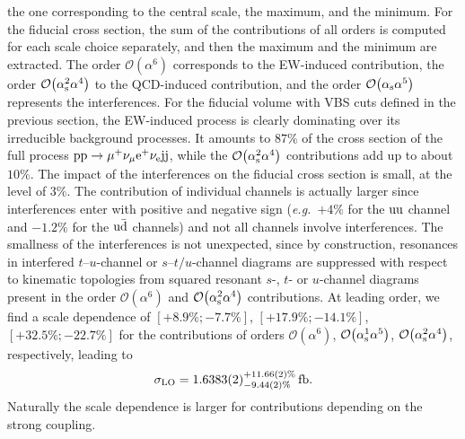\documentclass[a4article,11pt]{article}
\begin{document}
the one corresponding to the central scale, the maximum, and the
minimum.  For the fiducial cross section, the sum of the contributions
of all orders is computed for each scale choice separately, and then
the maximum and the minimum are extracted.  The order
$\mathcal{O}{\left(\alpha^{6}\right)}$ corresponds to the EW-induced
contribution, the order $\mathcal{O}{\left(\alpha_{\rm
      s}^2\alpha^{4}\right)}$ to the QCD-induced contribution, and the
order $\mathcal{O}{\left(\alpha_\text{s}\alpha^{5}\right)}$ represents the
interferences.  For the fiducial volume with VBS cuts defined in the
previous section, the EW-induced process is clearly dominating over
its irreducible background processes.  It amounts to $87\%$ of the
cross section of the full process
$\text{p}\text{p}\to\mu^+\nu_\mu\text{e}^+\nu_{\text{e}}\text{j}\text{j}$, while the
$\mathcal{O}{\left(\alpha_\text{s}^2\alpha^{4}\right)}$ contributions add up
to about $10\%$.  The impact of the interferences on the fiducial
cross section is small, at the level of $3\%$.  The contribution of
individual channels is actually larger since interferences enter with
positive and negative sign (\emph{e.g.}\ $+4\%$ for the $\text{u}\text{u}$
channel and $-1.2\%$ for the $\text{u}\bar{\text{d}}$ channels) 
and not all
channels involve interferences.  The smallness of the interferences is
not unexpected, since by construction, resonances in interfered
$t$--$u$-channel or $s$--$t/u$-channel diagrams are suppressed with
respect to kinematic topologies from squared resonant $s$-, $t$- or
$u$-channel diagrams present in the order
$\mathcal{O}{\left(\alpha^{6}\right)}$ and
$\mathcal{O}{\left(\alpha_\text{s}^2\alpha^{4}\right)}$ contributions.  At
leading order, we find a scale dependence of
$\left[+8.9\%;-7.7\%\right]$, $\left[+17.9\%;-14.1\%\right]$,
$\left[+32.5\%;-22.7\%\right]$ for the contributions of orders
$\mathcal{O}{\left(\alpha^{6}\right)}$, $\mathcal{O}{\left(\alpha_{\rm
      s}^1\alpha^{5}\right)}$, $\mathcal{O}{\left(\alpha_{\rm
      s}^2\alpha^{4}\right)}$, respectively, leading to
 \begin{equation}
\sigma_{\rm LO} = 1.6383(2)_{-9.44(2)\%}^{+11.66(2)\%}\fb.
\end{equation}
Naturally the scale dependence is larger for contributions
depending on the strong coupling.
\end{document}
